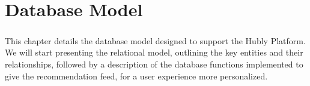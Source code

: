 \chapter{Database Model}\label{ch:database}

\paragraph{}This chapter details the database model designed to support the Hubly Platform. We will start presenting the relational model, outlining the key entities and their relationships, followed by a description of the database functions implemented to give the recommendation feed, for a user experience more personalized.

